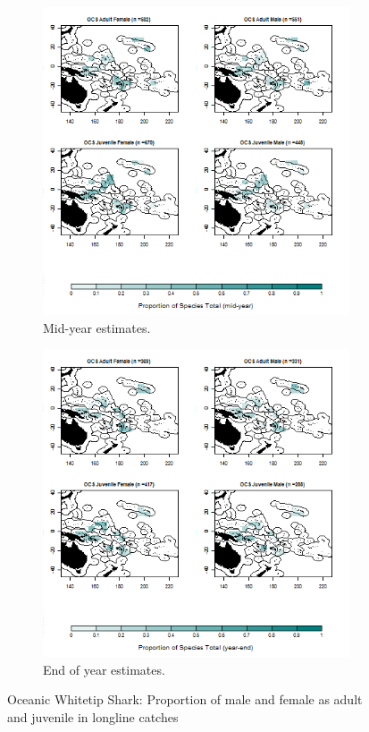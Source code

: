 \documentclass[12pt]{SCreport}
\begin{document}
\begin{landscape}
\begin{figure}
\centering
   \begin{subfigure}[b]{0.6\textwidth}
       \includegraphics[width=\textwidth]{../GRAPHICS/Map_maturity_sex_OCS_MY}
       \caption{Mid-year estimates.}
       \label{fig:test1}
   \end{subfigure}
   \begin{subfigure}[b]{0.6\textwidth}
       \includegraphics[width=\textwidth]{../GRAPHICS/Map_maturity_sex_OCS}
       \caption{End of year estimates.}
       \label{fig:test2}
   \end{subfigure}
\caption{Oceanic Whitetip Shark: Proportion of male and female as adult and juvenile in longline catches }
\label{fig:test} 
\end{figure}
\end{landscape}
\end{document}

